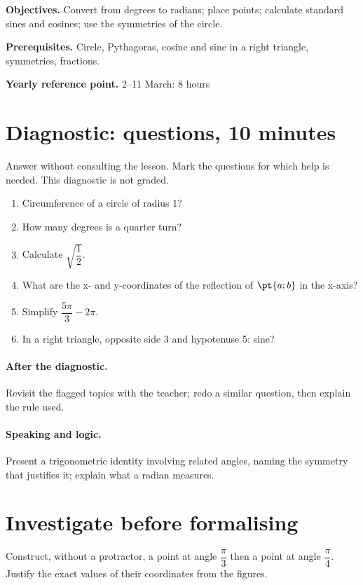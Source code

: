 \label{C10}
\begin{keypoint}
\textbf{Objectives.} Convert from degrees to radians; place points; calculate standard sines and cosines; use the symmetries of the circle.

\textbf{Prerequisites.} Circle, Pythagoras, cosine and sine in a right triangle, symmetries, fractions.

\textbf{Yearly reference point.} 2--11 March: 8 hours\end{keypoint}
\section*{Diagnostic:  questions, 10 minutes}\label{C10-D}
Answer without consulting the lesson. Mark the questions for which help is needed. This diagnostic is not graded.
\begin{enumerate}
\item Circumference of a circle of radius 1?
\item How many degrees is a quarter turn?
\item Calculate $\sqrt {\dfrac{1}{2}}$.
\item What are the x- and y-coordinates of the reflection of $\pt{a;b}$ in the x-axis?
\item Simplify $\dfrac{5\pi}{3}-2\pi $.
\item In a right triangle, opposite side 3 and hypotenuse 5: sine?
\end{enumerate}
\paragraph{After the diagnostic.} Revisit the flagged topics with the teacher; redo a similar question, then explain the rule used.
\paragraph{Speaking and logic.} Present a trigonometric identity involving related angles, naming the symmetry that justifies it; explain what a radian measures.
\mxnewpage
\section*{Investigate before formalising}\label{C10-RECH}
Construct, without a protractor, a point at angle $\dfrac{\pi}{3}$ then a point at angle $\dfrac{\pi}{4}$. Justify the exact values of their coordinates from the figures.
